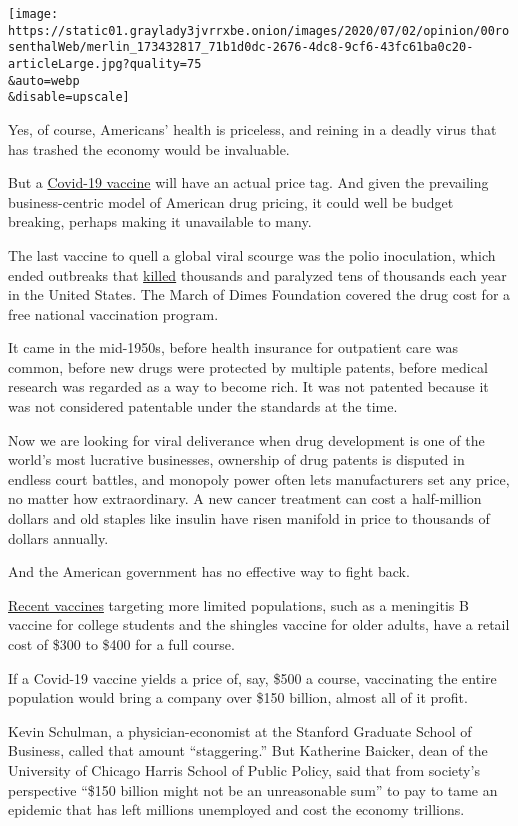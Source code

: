 \texttt{[image: https://static01.graylady3jvrrxbe.onion/images/2020/07/02/opinion/00rosenthalWeb/merlin\_173432817\_71b1d0dc-2676-4dc8-9cf6-43fc61ba0c20-articleLarge.jpg?quality=75\\\&auto=webp\\\&disable=upscale]}

Yes, of course, Americans' health is priceless, and reining in a deadly
virus that has trashed the economy would be invaluable.

But a
\href{https://www.nytimes3xbfgragh.onion/2020/07/09/health/regeneron-monoclonal-antibodies.html}{Covid-19
vaccine} will have an actual price tag. And given the prevailing
business-centric model of American drug pricing, it could well be budget
breaking, perhaps making it unavailable to many.

The last vaccine to quell a global viral scourge was the polio
inoculation, which ended outbreaks that
\href{https://www.cdc.gov/polio/what-is-polio/polio-us.html}{killed}
thousands and paralyzed tens of thousands each year in the United
States. The March of Dimes Foundation covered the drug cost for a free
national vaccination program.

It came in the mid-1950s, before health insurance for outpatient care
was common, before new drugs were protected by multiple patents, before
medical research was regarded as a way to become rich. It was not
patented because it was not considered patentable under the standards at
the time.

Now we are looking for viral deliverance when drug development is one of
the world's most lucrative businesses, ownership of drug patents is
disputed in endless court battles, and monopoly power often lets
manufacturers set any price, no matter how extraordinary. A new cancer
treatment can cost a half-million dollars and old staples like insulin
have risen manifold in price to thousands of dollars annually.

And the American government has no effective way to fight back.

\href{https://www.aarp.org/health/medicare-qa-tool/does-medicare-cover-shingles-shot/}{Recent
vaccines} targeting more limited populations, such as a meningitis B
vaccine for college students and the shingles vaccine for older adults,
have a retail cost of \$300 to \$400 for a full course.

If a Covid-19 vaccine yields a price of, say, \$500 a course,
vaccinating the entire population would bring a company over \$150
billion, almost all of it profit.

Kevin Schulman, a physician-economist at the Stanford Graduate School of
Business, called that amount ``staggering.'' But Katherine Baicker, dean
of the University of Chicago Harris School of Public Policy, said that
from society's perspective ``\$150 billion might not be an unreasonable
sum'' to pay to tame an epidemic that has left millions unemployed and
cost the economy trillions.


